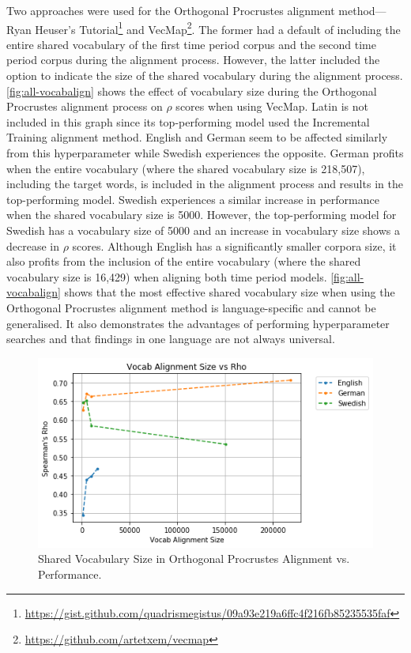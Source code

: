 Two approaches were used for the Orthogonal Procrustes alignment method—Ryan Heuser’s Tutorial\footnote{\url{https://gist.github.com/quadrismegistus/09a93e219a6ffc4f216fb85235535faf}} and VecMap\footnote{\url{https://github.com/artetxem/vecmap}}. The former had a default of including the entire shared vocabulary of the first time period corpus and the second time period corpus during the alignment process. However, the latter included the option to indicate the size of the shared vocabulary during the alignment process. \autoref{fig:all-vocabalign} shows the effect of vocabulary size during the Orthogonal Procrustes alignment process on $\rho$ scores when using VecMap. Latin is not included in this graph since its top-performing model used the Incremental Training alignment method. English and German seem to be affected similarly from this hyperparameter while Swedish experiences the opposite. German profits when the entire vocabulary (where the shared vocabulary size is 218,507), including the target words, is included in the alignment process and results in the top-performing model. Swedish experiences a similar increase in performance when the shared vocabulary size is 5000. However, the top-performing model for Swedish has a vocabulary size of 5000 and an increase in vocabulary size shows a decrease in $\rho$ scores. Although English has a significantly smaller corpora size, it also profits from the inclusion of the entire vocabulary (where the shared vocabulary size is 16,429) when aligning both time period models. \autoref{fig:all-vocabalign} shows that the most effective shared vocabulary size when using the Orthogonal Procrustes alignment method is language-specific and cannot be generalised. It also demonstrates the advantages of performing hyperparameter searches and that findings in one language are not always universal.

\begin{figure}[h]
  \centering
  \includegraphics[width=.8\linewidth]{sections/figures/vocabalignment_all.png}
  \caption{Shared Vocabulary Size in Orthogonal Procrustes Alignment vs. Performance.}
  \label{fig:all-vocabalign}
\end{figure}


